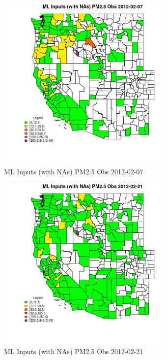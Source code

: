 
\clearpage 

\begin{figure} 
\centering  
\includegraphics[width=0.77\textwidth]{Code_Outputs/Report_ML_input_PM25_Step4_part_f_de_duplicated_aveswNAs_CountyPM25_ObsMean2012-02-07.jpg} 
\caption{\label{fig:Report_ML_input_PM25_Step4_part_f_de_duplicated_aveswNAsCountyPM25_ObsMean2012-02-07}ML Inputs (with NAs) PM2.5 Obs 2012-02-07} 
\end{figure} 
 

\begin{figure} 
\centering  
\includegraphics[width=0.77\textwidth]{Code_Outputs/Report_ML_input_PM25_Step4_part_f_de_duplicated_aveswNAs_CountyPM25_ObsMean2012-02-21.jpg} 
\caption{\label{fig:Report_ML_input_PM25_Step4_part_f_de_duplicated_aveswNAsCountyPM25_ObsMean2012-02-21}ML Inputs (with NAs) PM2.5 Obs 2012-02-21} 
\end{figure} 
 

